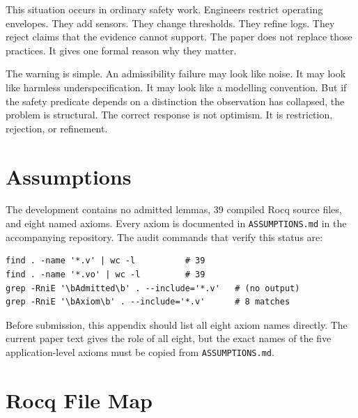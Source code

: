 \documentclass[a4paper,11pt]{article}
\begin{document}
This situation occurs in ordinary safety work. Engineers restrict operating
envelopes. They add sensors. They change thresholds. They refine logs. They
reject claims that the evidence cannot support. The paper does not replace
those practices. It gives one formal reason why they matter.

The warning is simple. An admissibility failure may look like noise. It may look
like harmless underspecification. It may look like a modelling convention. But
if the safety predicate depends on a distinction the observation has collapsed,
the problem is structural. The correct response is not optimism. It is
restriction, rejection, or refinement.

\appendix

\section{Assumptions}
\label{app:assumptions}

The development contains no admitted lemmas, 39 compiled Rocq source files, and
eight named axioms. Every axiom is documented in \texttt{ASSUMPTIONS.md} in the
accompanying repository. The audit commands that verify this status are:

\begin{verbatim}
find . -name '*.v' | wc -l          # 39
find . -name '*.vo' | wc -l         # 39
grep -RniE '\bAdmitted\b' . --include='*.v'   # (no output)
grep -RniE '\bAxiom\b' . --include='*.v'      # 8 matches
\end{verbatim}

Before submission, this appendix should list all eight axiom names directly.
The current paper text gives the role of all eight, but the exact names of the
five application-level axioms must be copied from \texttt{ASSUMPTIONS.md}.

\section{Rocq File Map}
\label{app:filemap}
\end{document}

